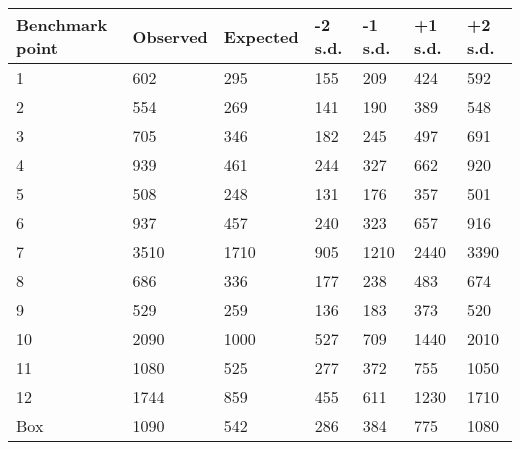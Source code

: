 \documentclass[border=5pt]{standalone}
\begin{document}
  \minipage{18cm}

  \centering
  \small
  
  \begin{tabular}{l l l l l l l }
\hline
Benchmark point & Observed & Expected &
-2 s.d. & -1 s.d. & +1 s.d. & +2 s.d.  \\
\hline
1 &   602  &   295  &   155  &   209  &   424  &   592  \\
2 &   554  &   269  &   141  &   190  &   389  &   548  \\
3 &   705  &   346  &   182  &   245  &   497  &   691  \\
4 &   939  &   461  &   244  &   327  &   662  &   920  \\
5 &   508  &   248  &   131  &   176  &   357  &   501  \\
6 &   937  &   457  &   240  &   323  &   657  &   916  \\
7 &   3510  &   1710  &   905  &   1210  &   2440  &   3390  \\
8 &   686  &   336  &   177  &   238  &   483  &   674  \\
9 &   529  &   259  &   136  &   183  &   373  &   520  \\
10 &   2090  &   1000  &   527  &   709  &   1440  &   2010  \\
11 &   1080  &   525  &   277  &   372  &   755  &   1050  \\
12 &   1744  &   859  &   455  &   611  &   1230  &   1710  \\
Box &   1090  &   542  &   286  &   384  &   775  &   1080  \\
   \hline
\end{tabular}

  \endminipage
\end{document}
